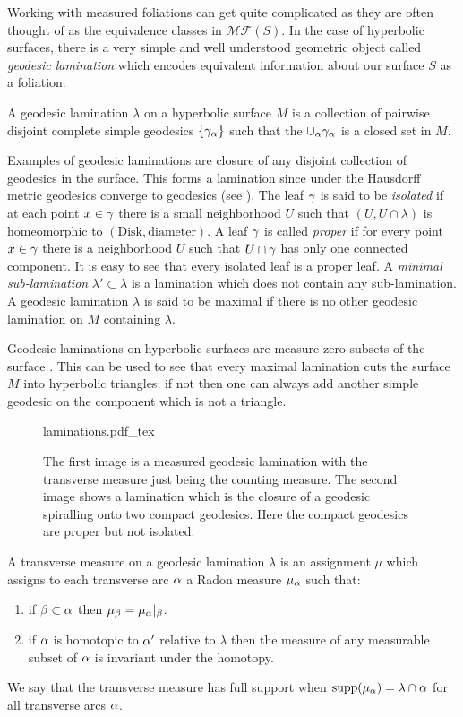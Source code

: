 Working with measured foliations can get quite complicated as they are often thought of as the equivalence classes in $ \mathcal{MF}(S)$. In the case of hyperbolic surfaces, there is a very simple and well understood geometric object called \textit{geodesic lamination} which encodes equivalent information about our surface $S$ as a foliation. 
\begin{definition}
  A geodesic lamination $\lambda$ on a hyperbolic surface $M$ is a collection of pairwise disjoint complete simple geodesics $\{\gamma_\alpha\}$ such that the $\cup_{\alpha}\gamma_\alpha$ is a closed set in $M$.
\end{definition}
Examples of geodesic laminations are closure of any disjoint collection of geodesics in the surface. This forms a lamination since under the Hausdorff metric geodesics converge to geodesics (see \cite{casson}). The leaf $\gamma$ is said to be \textit{isolated} if at each point $x\in \gamma$ there is a small neighborhood $U$ such that $(U,U\cap \lambda)$ is homeomorphic to $(\text{Disk}, \text{diameter})$. A leaf $\gamma$ is called \textit{proper} if for every point $x\in\gamma$ there is a neighborhood $U$ such that $U\cap\gamma$ has only one connected component. It is easy to see that every isolated leaf is a proper leaf. A \textit{minimal sub-lamination} $\lambda'\subset \lambda$ is a lamination which does not contain any sub-lamination. A geodesic lamination $\lambda$ is said to be maximal if there is no other geodesic lamination on $M$ containing $\lambda$. 
\begin{rem}
  Geodesic laminations on hyperbolic surfaces are measure zero subsets of the surface \cite{casson}. This can be used to see that every maximal lamination cuts the surface $M$ into hyperbolic triangles: if not then one can always add another simple geodesic on the component which is not a triangle. 
\end{rem}
\begin{figure}[t]\label{fig:laminations}
  \centering
  \def\svgwidth{0.7\textwidth}
  {laminations.pdf_tex}
  \caption[Example of Laminations]{The first image is a measured geodesic lamination with the transverse measure just being the counting measure. The second image shows a lamination which is the closure of a geodesic spiralling onto two compact geodesics. Here the compact geodesics are proper but not isolated.}
\end{figure}
\begin{definition}
  A transverse measure on a geodesic lamination $\lambda$ is an assignment $\mu$ which assigns to each transverse arc $\alpha$ a Radon measure $\mu_\alpha$ such that:
  \begin{enumerate}
    \item if $\beta\subset \alpha$ then $\mu_\beta = \mu_\alpha|_{\beta}$.
    \item if $\alpha$ is homotopic to $\alpha'$ relative to $\lambda$ then the measure of any measurable subset of $\alpha$ is invariant under the homotopy. 
  \end{enumerate}
  We say that the transverse measure has full support when $\text{supp}(\mu_\alpha) = \lambda\cap \alpha$ for all transverse arcs $\alpha$. 
\end{definition}
